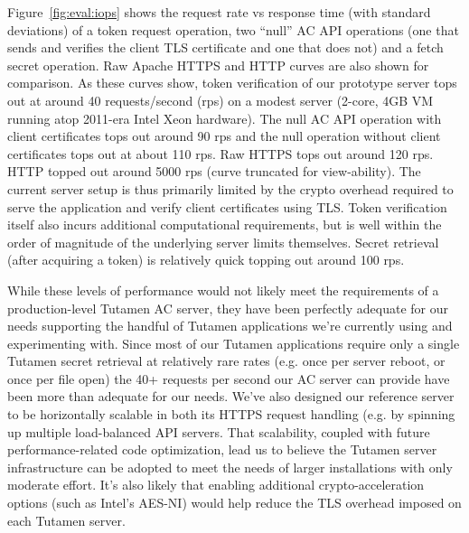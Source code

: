 Figure~\ref{fig:eval:iops} shows the request rate vs response time
(with standard deviations) of a token request operation, two ``null''
AC API operations (one that sends and verifies the client TLS
certificate and one that does not) and a fetch secret operation. Raw
Apache HTTPS and HTTP curves are also shown for comparison. As these
curves show, token verification of our prototype server tops out at
around 40 requests/second (rps) on a modest server (2-core, 4GB VM
running atop 2011-era Intel Xeon hardware). The null AC API operation
with client certificates tops out around 90 rps and the null operation
without client certificates tops out at about 110 rps. Raw HTTPS tops
out around 120 rps. HTTP topped out around 5000 rps (curve truncated
for view-ability). The current server setup is thus primarily limited
by the crypto overhead required to serve the application and verify
client certificates using TLS. Token verification itself also incurs
additional computational requirements, but is well within the order of
magnitude of the underlying server limits themselves. Secret retrieval
(after acquiring a token) is relatively quick topping out around 100
rps.

While these levels of performance would not likely meet the
requirements of a production-level Tutamen AC server, they have been
perfectly adequate for our needs supporting the handful of Tutamen
applications we're currently using and experimenting with. Since most
of our Tutamen applications require only a single Tutamen secret
retrieval at relatively rare rates (e.g. once per server reboot, or
once per file open) the 40+ requests per second our AC server can
provide have been more than adequate for our needs. We've also
designed our reference server to be horizontally scalable in both its
HTTPS request handling (e.g. by spinning up multiple load-balanced API
servers. That scalability, coupled with future performance-related
code optimization, lead us to believe the Tutamen server
infrastructure can be adopted to meet the needs of larger
installations with only moderate effort. It's also likely that
enabling additional crypto-acceleration options (such as Intel's
AES-NI) would help reduce the TLS overhead imposed on each Tutamen
server.

